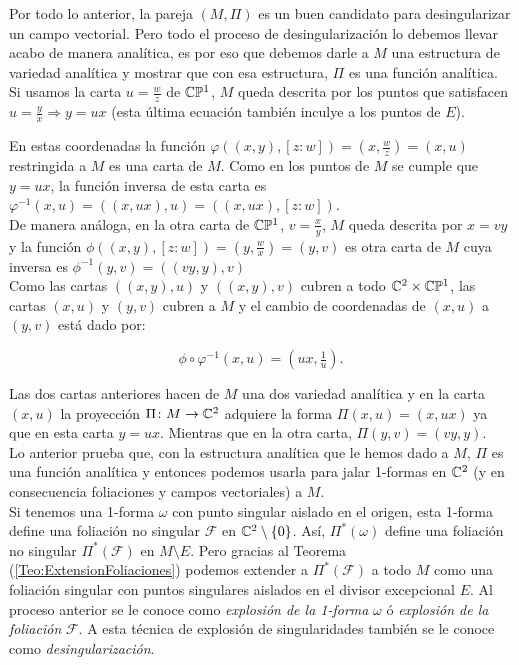 Por todo lo anterior, la pareja $(M,\Pi)$ es un buen candidato para desingularizar un campo vectorial. Pero todo el proceso de desingularización lo debemos llevar acabo de manera analítica, es por eso que debemos darle a $M$ una estructura de variedad analítica y mostrar que con esa estructura, $\Pi$ es una función analítica.\\   

Si usamos la carta $u=\tfrac{w}{z}$ de $\mathbb{C}\mathbb{P}^{1}$, $M$ queda descrita por los puntos que satisfacen $u=\tfrac{y}{x}\Rightarrow y=ux$ (esta última ecuación también inculye a los puntos de $E$).

En estas coordenadas la función $\varphi((x,y),[z:w])=(x,\tfrac{w}{z})=(x,u)$ restringida a $M$ es una carta de $M$. Como en los puntos de $M$ se cumple que $y=ux$, la función inversa de esta carta es $\varphi^{-1}(x,u)=((x,ux),u)=((x,ux),[z:w])$.\\

De manera análoga, en la otra carta de $\mathbb{C}\mathbb{P}^{1}$, $v=\tfrac{x}{y}$, $M$ queda descrita por $x=vy$ y la función $\phi((x,y),[z:w])=(y,\tfrac{w}{x})=(y,v)$ es otra carta de $M$ cuya inversa es $\phi^{-1}(y,v)=((vy,y),v)$\\

Como las cartas $((x,y),u)$ y $((x,y),v)$ cubren a todo $\mathbb{C}^{2}\times\mathbb{C}\mathbb{P}^{1}$, las cartas $(x,u)$ y $(y,v)$ cubren a $M$ y el cambio de coordenadas de $(x,u)$ a $(y,v)$ está dado por:

\begin{equation}
\label{CambiosCoordenadasExplosion}
\phi\circ\varphi^{-1}(x,u)=(ux,\tfrac{1}{u}).
\end{equation}

Las dos cartas anteriores hacen de $M$ una dos variedad analítica y en la carta $(x,u)$ la proyección $\Pi\colon M\rightarrow\mathbb{C}^{2}$ adquiere la forma $\Pi(x,u)=(x,ux)$ ya que en esta carta $y=ux$. Mientras que en la otra carta, $\Pi(y,v)=(vy,y)$.\\

Lo anterior prueba que, con la estructura analítica que le hemos dado a $M$, $\Pi$ es una función analítica y entonces podemos usarla para jalar 1-formas en $\mathbb{C}^{2}$ (y en consecuencia foliaciones y campos vectoriales) a $M$.\\

Si tenemos una 1-forma $\omega$ con punto singular aislado en el origen, esta 1-forma define una foliación no singular $\mathcal{F}$ en $\mathbb{C}^{2}\setminus\{0\}$. Así, $\Pi^{*}(\omega)$ define una foliación no singular $\Pi^{*}(\mathcal{F})$ en $M\setminus E$. Pero gracias al Teorema (\ref{Teo:ExtensionFoliaciones}) podemos extender a $\Pi^{*}(\mathcal{F})$ a todo $M$ como una foliación singular con puntos singulares aislados en el divisor excepcional $E$. Al proceso anterior se le conoce como \emph{explosión de la 1-forma} $\omega$ ó \emph{explosión de la foliación} $\mathcal{F}$. A esta técnica de explosión de singularidades también se le conoce como \emph{desingularización}.

